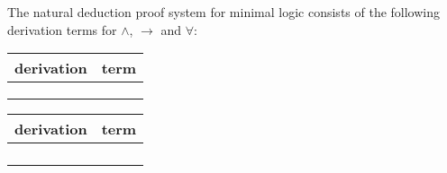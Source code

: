 \begin{mydef} 
The natural deduction proof system for minimal logic  consists of the following derivation terms for $\wedge$, $\to$ and $\forall$: 
\begin{center}

\begin{tabular}{| c | c |} \hline
derivation & term \\
\hline 
\raisebox{-1\height}{$u:A$} & \raisebox{-1\height}{$u^A$} \\ [3ex] \hline
\raisebox{-1.2\height}{
\AxiomC{$|M$}
\noLine
\UnaryInfC{$A$}
\AxiomC{$|N$}
\noLine
\UnaryInfC{$B $}
\RightLabel{$\wedge^+$}
\BinaryInfC{$A \wedge B$}
\DisplayProof} &  \raisebox{-2.8\height}{$\langle M^A, N^B \rangle^{A \wedge B}$} \\ [10ex]  \hline
\raisebox{-1.5\height}{
\AxiomC{$|M$}
\noLine
\UnaryInfC{$A \wedge B$}
\RightLabel{$\wedge^-_0$}
\UnaryInfC{$A$}
\DisplayProof \hspace{10pt}
\AxiomC{$|M$}
\noLine
\UnaryInfC{$A \wedge B$}
\RightLabel{$\wedge^-_1$}
\UnaryInfC{$B$}
\DisplayProof} & \raisebox{-2.8\height}{$(M^{A \wedge B} 0)^A \quad (M^{A \wedge B} 1)^B$} \\ [10ex] \hline


\end{tabular}
\end{center}

\begin{center}
\begin{tabular}{|c|c|} \hline

derivation & term \\ \hline

\raisebox{-1\height}{
\AxiomC{$\mathass{u: \,A}$}
\noLine
\UnaryInfC{$| \,M$}
\noLine
\UnaryInfC{$B$}
\RightLabel{$\to^+$}
\UnaryInfC{$A \to B$}
\DisplayProof} & \raisebox{-3.2\height}{$(\lambda u^AM^B)^{A \to B}$} \\ [12ex] \hline

\raisebox{-1\height}{
\AxiomC{$|M$}
\noLine
\UnaryInfC{$A \to B$}
\AxiomC{$|N$}
\noLine
\UnaryInfC{$A$}
\RightLabel{$\to^-$}
\BinaryInfC{$B$}
\DisplayProof} & \raisebox{-1.2\height}{$(M^{A \to B} N^{A})^B$} \\ [5ex] \hline



\raisebox{-1\height}{
\AxiomC{$|M$}
\noLine
\UnaryInfC{$A$}
\RightLabel{$\forall^+x \ (var.cond.)$}
\UnaryInfC{$\forall x A$}
\DisplayProof} & \raisebox{-2.8\height}{$(\lambda x M^A)^{\forall x A} \, (var.cond.)$}  \\ [10ex] \hline

\raisebox{-1\height}{
\AxiomC{$|M$}
\noLine
\UnaryInfC{$\forall x. A$}
\AxiomC{t}
\RightLabel{$\forall^-$}
\BinaryInfC{$A[x:=t]$}
\DisplayProof} & \raisebox{-2.8\height}{$(M^{\forall x A}t)^{A[x:=t]}$} \\ [10ex] \hline


\end{tabular}
\end{center}


\end{mydef}
